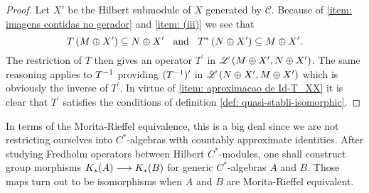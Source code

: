 \begin{lema}
\begin{proof}
Let $X'$ be the Hilbert submodule of $X$ generated by $\mathscr C$. Because of \ref{item: imagens contidas no gerador} and \ref{item: (iii)} we see that 
$$T\left(M \oplus X'\right) \subseteq N \oplus X' \hspace{0.25cm}\operatorname{and}\hspace{0.25cm} T^{*}\left(N \oplus X'\right) \subseteq M \oplus X'.$$ 
The restriction of $T$ then gives an operator $T^{\prime}$ in $\mathscr L\left(M \oplus X', N \oplus X'\right)$. The same reasoning applies to ${{T}^{-1}}$ providing $({{T}^{-1}})^{\prime}$ in $\mathscr L\left(N \oplus X', M \oplus X'\right)$ which is obviously the inverse of $T^{\prime}$. In virtue of \ref{item: aproximacao de Id-T_XX} it is clear that $T^{\prime}$ satisfies the conditions of definition \ref{def: quasi-stabli-isomorphic}.
\end{proof}
\end{lema}

In terms of the Morita-Rieffel equivalence, this is a big deal since we are not restricting ourselves into $C^*$-algebras with countably approximate identities. After studying Fredholm operators between Hilbert $C^*$-modules, one shall construct group morphisms $K_*(A) \longrightarrow K_*(B)$ for generic $C^*$-algebras $A$ and $B$. Those maps turn out to be isomorphisms when $A$ and $B$ are Morita-Rieffel equivalent.

